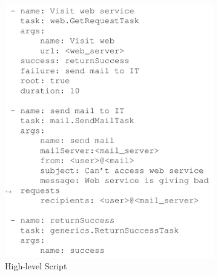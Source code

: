 \documentclass[12pt]{report}
\begin{document}
\begin{figure}[h!]
  \centering
  \begin{subfigure}[b]{0.45\linewidth}
  	\centering
	\includegraphics[width=1\textwidth]{./pictures/yoshka-hls}
    \caption{High-level Script}
  \end{subfigure}
  \begin{subfigure}[b]{0.45\linewidth}

\end{subfigure}
\end{figure}
\end{document}
